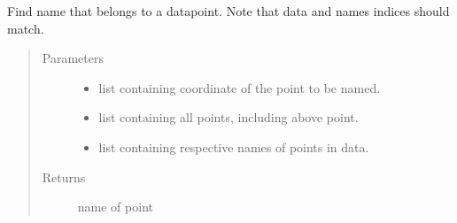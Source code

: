 \documentclass[letterpaper,10pt,english]{sphinxmanual}
\begin{document}
\begin{fulllineitems}
\label{\detokenize{classification:classification.findName}}
\sphinxAtStartPar
Find name that belongs to a datapoint. Note that data and names indices should match.
\begin{quote}\begin{description}
\item[{Parameters}] \leavevmode\begin{itemize}
\item {} 
\sphinxAtStartPar
{} \textendash{} list containing coordinate of the point to be named.

\item {} 
\sphinxAtStartPar
{} \textendash{} list containing all points, including above point.

\item {} 
\sphinxAtStartPar
{} \textendash{} list containing respective names of points in data.

\end{itemize}

\item[{Returns}] \leavevmode
\sphinxAtStartPar
name of point

\end{description}\end{quote}

\end{fulllineitems}

\end{document}
